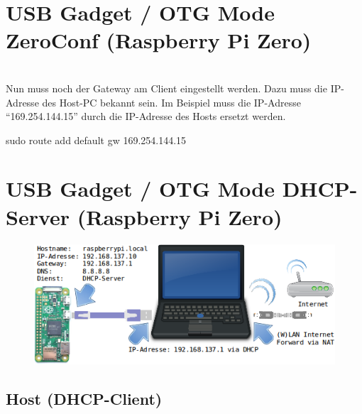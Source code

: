 
\section{USB Gadget / OTG Mode ZeroConf (Raspberry Pi Zero)}




~\\
Nun muss noch der Gateway am Client eingestellt werden. Dazu muss die IP-Adresse des Host-PC bekannt sein. Im Beispiel muss die IP-Adresse "`169.254.144.15"' durch die IP-Adresse des Hosts ersetzt werden.   


\begin{console} 
	sudo route add default gw 169.254.144.15
\end{console}

\clearpage
\section{USB Gadget / OTG Mode DHCP-Server (Raspberry Pi Zero)}

\begin{figure}[ht]
	\centering
	\includegraphics[scale=0.9]{images/Aufbau_Schema.png}
\end{figure}



\subsection{Host (DHCP-Client)}



\clearpage

\clearpage

\clearpage
%



